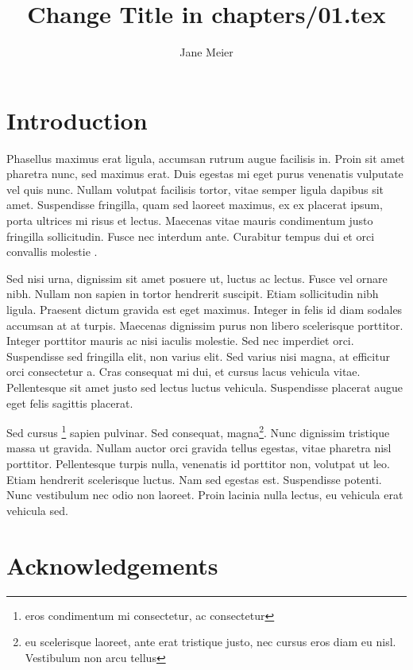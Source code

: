 \documentclass[output=paper]{./langscibook}
\title{Change Title in chapters/01.tex}
\author{%
 Jane Meier  \affiliation{University of Eden}
}
\begin{document}
\maketitle

\section{Introduction}
Phasellus maximus erat ligula, accumsan rutrum augue facilisis in. Proin sit amet pharetra nunc, sed maximus erat. Duis egestas mi eget purus venenatis vulputate vel quis nunc. Nullam volutpat facilisis tortor, vitae semper ligula dapibus sit amet. Suspendisse fringilla, quam sed laoreet maximus, ex ex placerat ipsum, porta ultrices mi risus et lectus. Maecenas vitae mauris condimentum justo fringilla sollicitudin. Fusce nec interdum ante. Curabitur tempus dui et orci convallis molestie \citep{Chomsky1957}.

Sed nisi urna, dignissim sit amet posuere ut, luctus ac lectus. Fusce vel ornare nibh. Nullam non sapien in tortor hendrerit suscipit. Etiam sollicitudin nibh ligula. Praesent dictum gravida est eget maximus. Integer in felis id diam sodales accumsan at at turpis. Maecenas dignissim purus non libero scelerisque porttitor. Integer porttitor mauris ac nisi iaculis molestie. Sed nec imperdiet orci. Suspendisse sed fringilla elit, non varius elit. Sed varius nisi magna, at efficitur orci consectetur a. Cras consequat mi dui, et cursus lacus vehicula vitae. Pellentesque sit amet justo sed lectus luctus vehicula. Suspendisse placerat augue eget felis sagittis placerat.

Sed cursus \footnote{eros condimentum mi consectetur, ac consectetur} sapien pulvinar. Sed consequat, magna\footnote{eu scelerisque laoreet, ante erat tristique justo, nec cursus eros diam eu nisl. Vestibulum non arcu tellus}. Nunc dignissim tristique massa ut gravida. Nullam auctor orci gravida tellus egestas, vitae pharetra nisl porttitor. Pellentesque turpis nulla, venenatis id porttitor non, volutpat ut leo. Etiam hendrerit scelerisque luctus. Nam sed egestas est. Suspendisse potenti. Nunc vestibulum nec odio non laoreet. Proin lacinia nulla lectus, eu vehicula erat vehicula sed.


\section*{Acknowledgements}

{\sloppy
\printbibliography[heading=subbibliography,notkeyword=this]
}
\end{document}
